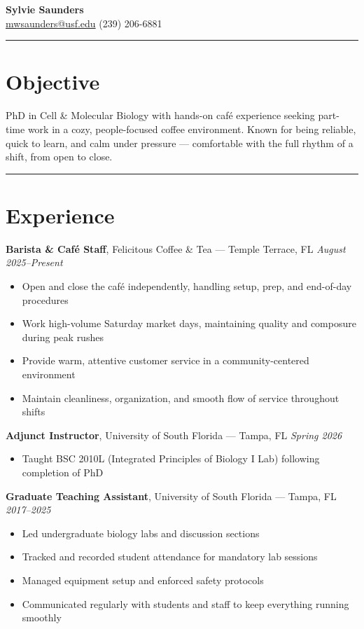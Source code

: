 \documentclass[11pt]{article}
\begin{document}
{\LARGE \textbf{Sylvie Saunders}} \\[4pt]
\href{mailto:mwsaunders@usf.edu}{mwsaunders@usf.edu} \quad\textbullet\quad (239) 206-6881

\vspace{0.4em}
\hrule
\vspace{0.5em}

\section*{Objective}
PhD in Cell \& Molecular Biology with hands-on caf\'{e} experience seeking part-time work in a
cozy, people-focused coffee environment. Known for being reliable, quick to learn, and calm
under pressure --- comfortable with the full rhythm of a shift, from open to close.

\hrule
\vspace{0.5em}

\section*{Experience}

\textbf{Barista \& Caf\'{e} Staff}, Felicitous Coffee \& Tea --- Temple Terrace, FL \hfill \textit{August 2025--Present} \\
\begin{itemize}[leftmargin=*, itemsep=1pt, topsep=3pt]
    \item Open and close the caf\'{e} independently, handling setup, prep, and end-of-day procedures
    \item Work high-volume Saturday market days, maintaining quality and composure during peak rushes
    \item Provide warm, attentive customer service in a community-centered environment
    \item Maintain cleanliness, organization, and smooth flow of service throughout shifts
\end{itemize}

\textbf{Adjunct Instructor}, University of South Florida --- Tampa, FL \hfill \textit{Spring 2026} \\
\begin{itemize}[leftmargin=*, itemsep=1pt, topsep=3pt]
    \item Taught BSC 2010L (Integrated Principles of Biology I Lab) following completion of PhD
\end{itemize}

\textbf{Graduate Teaching Assistant}, University of South Florida --- Tampa, FL \hfill \textit{2017--2025} \\
\begin{itemize}[leftmargin=*, itemsep=1pt, topsep=3pt]
    \item Led undergraduate biology labs and discussion sections
    \item Tracked and recorded student attendance for mandatory lab sessions
    \item Managed equipment setup and enforced safety protocols
    \item Communicated regularly with students and staff to keep everything running smoothly
\end{itemize}
\end{document}

